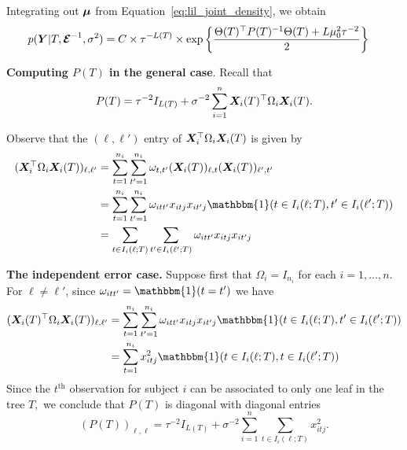 \documentclass[11pt]{article}
\begin{document}
Integrating out $\boldsymbol{\mu}$ from Equation~\eqref{eq:lil_joint_density}, we obtain
\begin{align*}
p(\bm{Y} \vert T, \boldsymbol{\mathcal{E}}^{-1}, \sigma^{2}) &= C \times \tau^{-L(T)} \times \exp\left\{\frac{\Theta(T)^{\top}P(T)^{-1}\Theta(T) + L\mu_{0}^{2}\tau^{-2}}{2}\right\}
\end{align*}

\textbf{Computing $P(T)$ in the general case}. Recall that
$$
P(T) = \tau^{-2}I_{L(T)} + \sigma^{-2}\sum_{i = 1}^{n}{\bm{X}_{i}(T)^{\top}\Omega_{i}\bm{X}_{i}(T)}.
$$

Observe that the $(\ell, \ell')$ entry of $\bm{X}_{i}^{\top}\Omega_{i}\bm{X}_{i}(T)$ is given by
\begin{align*}
(\bX_{i}^{\top}\Omega_{i}\bX_{i}(T))_{\ell,\ell'} &= \sum_{t = 1}^{n_{i}}{\sum_{t' = 1}^{n_{i}}{\omega_{t,t'}(\bX_{i}(T))_{\ell,t}(\bX_{i}(T))_{\ell',t'}}} \\
&= \sum_{t = 1}^{n_{i}}{\sum_{t' = 1}^{n_{i}}{\omega_{itt'}x_{itj}x_{it'j}\mathbbm{1}(t \in I_{i}(\ell;T), t' \in I_{i}(\ell';T))}} \\
&= \sum_{t \in I_{i}(\ell;T)}{\sum_{t' \in I_{i}(\ell';T)}{\omega_{itt'}x_{itj}x_{it'j}}}
\end{align*}





\textbf{The independent error case.} 
Suppose first that $\Omega_{i} = I_{n_{i}}$ for each $i = 1, \ldots, n.$
For $\ell \neq \ell'$, since $\omega_{itt'} = \mathbbm{1}(t = t')$ we have
\begin{align*}
(\bX_{i}(T)^{\top}\Omega_{i}\bX_{i}(T))_{\ell,\ell'} &= \sum_{t = 1}^{n_{i}}{\sum_{t' = 1}^{n_{i}}{\omega_{itt'}x_{itj}x_{it'j}\mathbbm{1}(t \in I_{i}(\ell;T), t' \in I_{i}(\ell';T))}} \\
&= \sum_{t = 1}^{n_{i}}{x_{itj}^{2}\mathbbm{1}(t \in I_{i}(\ell;T), t \in I_{i}(\ell';T))} \\
\end{align*}
Since the $t^{\text{th}}$ observation for subject $i$ can be associated to only one leaf in the tree $T,$ we conclude that $P(T)$ is diagonal with diagonal entries
$$
(P(T))_{\ell,\ell} = \tau^{-2}I_{L(T)} + \sigma^{-2}\sum_{i = 1}^{n}{\sum_{t \in I_{i}(\ell;T)}{x_{itj}^{2}}}.
$$
\end{document}
